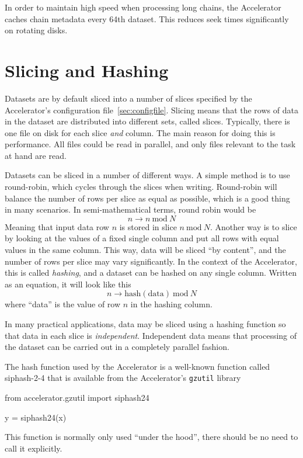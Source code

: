 In order to maintain high speed when processing long chains, the
Accelerator caches chain metadata every 64th dataset.  This reduces
seek times significantly on rotating disks.



\section{Slicing and Hashing}
\label{sec:slicing_and_hashing}

Datasets are by default sliced into a number of slices specified by
the Accelerator's configuration file~\ref{sec:configfile}.  Slicing means that the
rows of data in the dataset are distributed into different sets,
called slices.  Typically, there is one file on disk for each slice
\textsl{and} column.  The main reason for doing this is performance.  All files
could be read in parallel, and only files relevant to the task at hand
are read.

Datasets can be sliced in a number of different ways.  A simple method
is to use round-robin, which cycles through the slices when writing.
Round-robin will balance the number of rows per slice as equal as
possible, which is a good thing in many scenarios.  In semi-mathematical
terms, round robin would be
\begin{equation*}
  n \longrightarrow n~\textrm{mod}~N
\end{equation*}
Meaning that input data row $n$ is stored in slice $n~\textrm{mod}~N$.
Another way is to slice by looking at the values of a fixed single
column and put all rows with equal values in the same column.  This
way, data will be sliced ``by content'', and the number of rows per
slice may vary significantly.  In the context of the Accelerator, this
is called \emph{hashing}, and a dataset can be hashed on any single
column.  Written as an equation, it will look like this
\begin{equation*}
  n \longrightarrow \textrm{hash}(\textrm{data})~\textrm{mod}~N
\end{equation*}
where ``data'' is the value of row $n$ in the hashing column.

In many practical applications, data may be sliced using a hashing
function so that data in each slice is \textsl{independent}.
Independent data means that processing of the dataset can be carried
out in a completely parallel fashion.

The hash function used by the Accelerator is a well-known function
called siphash-2-4 that is available from the
Accelerator's \texttt{gzutil} library
\begin{python}
from accelerator.gzutil import siphash24

y = siphash24(x)
\end{python}
This function is normally only used ``under the hood'', there should
be no need to call it explicitly.



